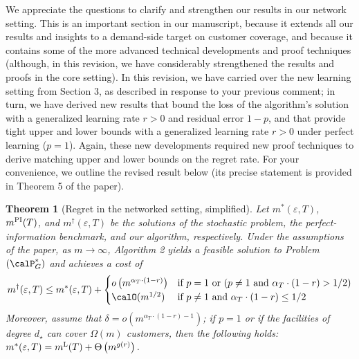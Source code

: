 \documentclass[11pt]{article}
\newtheorem{theorem}{Theorem}[] %
\begin{document}
We appreciate the questions to clarify and strengthen our results in our network setting. This is an important section in our manuscript, because it extends all our results and insights to a demand-side target on customer coverage, and because it contains some of the more advanced technical developments and proof techniques (although, in this revision, we have considerably strengthened the results and proofs in the core setting). In this revision, we have carried over the new learning setting from Section 3, as described in response to your previous comment; in turn, we have derived new results that bound the loss of the algorithm's solution with a generalized learning rate $r>0$ and residual error $1-p$, and that provide tight upper and lower bounds with a generalized learning rate $r>0$ under perfect learning ($p=1$). Again, these new developments required new proof techniques to derive matching upper and lower bounds on the regret rate. For your convenience, we outline the revised result below (its precise statement is provided in Theorem 5 of the paper).

\begin{theorem}[Regret in the networked setting, simplified]\label{thm:network_AE}
    Let $m^*(\varepsilon,T)$, $m^{\textsc{PI}}(T)$, and $m^\dagger(\varepsilon, T)$ be the solutions of the stochastic problem, the perfect-information benchmark, and our algorithm, respectively. Under the assumptions of the paper, as $m \to \infty$, Algorithm 2 yields a feasible solution to Problem $(\calP^*_G)$ and achieves a cost of
    $$m^\dagger(\varepsilon, T)\leq m^*(\varepsilon, T)+\begin{cases}
    	o\left(m^{\alpha_T \cdot (1-r)}\right)& \text{if }p=1 \text{ or } (p \neq 1 \text{ and } \alpha_T\cdot(1-r)>1/2)\\
    	\calO(m^{1/2}) & \text{if }p \neq 1\text{ and } \alpha_T\cdot(1-r)\leq 1/2
    \end{cases}$$
    Moreover, assume that $\delta = o\left(m^{\alpha_T\cdot(1-r)-1}\right)$; if $p=1$ or if the facilities of degree $d_\star$ can cover $\Omega(m)$ customers, then the following holds: $m^*(\varepsilon, T)= m^{\textsc{L}}(T)+\Theta\left(m^{g(r)}\right)$.
\end{theorem}
\end{document}
